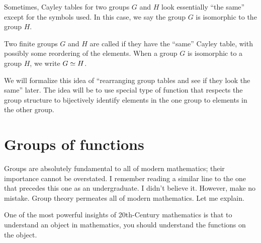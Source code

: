 \documentclass{ximera}
\begin{document}


Sometimes, Cayley tables for two groups $G$ and $H$ look essentially
``the same'' except for the symbols used. In this case, we say the
group $G$ is isomorphic to the group $H$.

\begin{definition}
  Two finite groups $G$ and $H$ are called  if they
  have the ``same'' Cayley table, with possibly some reordering of the
  elements. When a group $G$ is isomorphic to a group $H$, we write
  $G\simeq H$.
\end{definition}

We will formalize this idea of ``rearranging group tables and see if
they look the same'' later. The idea will be to use special type of
function that respects the group structure to bijectively identify
elements in the one group to elements in the other group.

\section{Groups of functions}

Groups are absolutely fundamental to all of modern mathematics; their
importance cannot be overstated. I remember reading a similar line to
the one that precedes this one as an undergraduate. I didn't believe
it. However, make no mistake. Group theory permeates all of modern
mathematics. Let me explain.

One of the most powerful insights of 20th-Century mathematics is that
to understand an object in mathematics, you should understand the
functions on the object.
\end{document}

